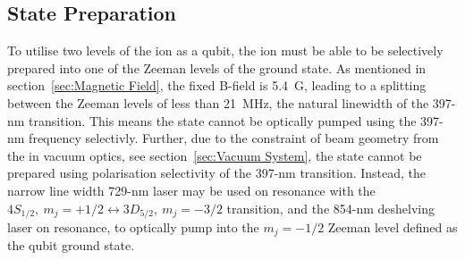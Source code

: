 \subsection{State Preparation}
\label{sec:Stateprep}

    To utilise two levels of the ion as a qubit, the ion must be able to be 
    selectively prepared into one of the Zeeman levels of the ground
    state. As mentioned in section~\ref{sec:Magnetic Field}, the fixed B-field is 5.4~G, leading to a splitting between the Zeeman
    levels of less than 21~MHz, the natural linewidth of the 397-nm transition.
    This means the state cannot be optically pumped using the 397-nm frequency selectivly.
    Further, due to the constraint of beam geometry from the in vacuum optics, see section~\ref{sec:Vacuum System},
    the state cannot be prepared using polarisation selectivity of the 397-nm transition. Instead,
    the narrow line width 729-nm laser may be used on resonance with the $4S_{1/2},~ m_j = +1/2 \leftrightarrow 3D_{5/2},~m_j = -3/2$ transition, and the 854-nm
    deshelving laser on resonance, to optically pump into the $m_j = -1/2$
    Zeeman level defined as the qubit ground state. \\


